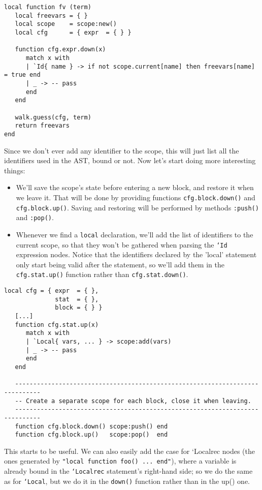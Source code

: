 \begin{Verbatim}[fontsize=\scriptsize]
local function fv (term)
   local freevars = { }
   local scope    = scope:new()
   local cfg      = { expr  = { } }

   function cfg.expr.down(x)
      match x with
      | `Id{ name } -> if not scope.current[name] then freevars[name] = true end
      | _ -> -- pass
      end
   end

   walk.guess(cfg, term)
   return freevars
end
\end{Verbatim}

Since we don't ever add any identifier to the scope, this will just list all the
identifiers used in the AST, bound or not. Now let's start doing more
interesting things:

\begin{itemize}
\item We'll save the scope's state before entering a new block, and restore it
  when we leave it. That will be done by providing functions {\tt cfg.block.down()}
  and {\tt cfg.block.up()}. Saving and restoring will be performed by methods
  {\tt :push()} and {\tt :pop()}.
\item Whenever we find a {\tt local} declaration, we'll add the list of
  identifiers to the current scope, so that they won't be gathered when parsing
  the {\tt `Id} expression nodes. Notice that the identifiers declared by the
  'local' statement only start being valid after the statement, so we'll add
  them in the {\tt cfg.stat.up()} function rather than {\tt cfg.stat.down()}.
\end{itemize}

\begin{Verbatim}[fontsize=\scriptsize]
local cfg = { expr  = { },
              stat  = { },
              block = { } }
   [...]
   function cfg.stat.up(x)
      match x with
      | `Local{ vars, ... } -> scope:add(vars)
      | _ -> -- pass
      end
   end

   -----------------------------------------------------------------------------
   -- Create a separate scope for each block, close it when leaving.
   -----------------------------------------------------------------------------
   function cfg.block.down() scope:push() end
   function cfg.block.up()   scope:pop()  end  
\end{Verbatim}

This starts to be useful. We can also easily add the case for `Localrec{ } nodes
(the ones generated by {\tt "local function foo() ... end"}), where a variable
is already bound in the {\tt`Localrec} statement's right-hand side; so we do the
same as for {\tt`Local}, but we do it in the {\tt down()} function rather than
in the up() one.

